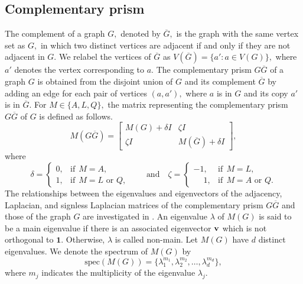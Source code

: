 \documentclass[12pt,a4paper]{article}
\def \v {{\bf v}}
\begin{document}
\subsection{Complementary prism}
The complement of a graph $G,$ denoted by $\overline{G},$ is the graph with the same vertex set as $G,$ in which two distinct vertices are adjacent if and only if they are not adjacent in $G.$ We relabel the vertices of $\overline{G}$ as $V(\overline{G})=\{a':a\in V(G)\},$ where $a'$ denotes the vertex corresponding to $a.$
The complementary prism $G\overline{G}$ of a graph $G$ is obtained from the disjoint union of $G$ and its complement $\overline{G}$ by adding an edge for each pair of vertices $(a,a'),$ where $a$ is in $G$ and its copy $a'$ is in $\overline{G}.$  
For $M\in\{A,L,Q\},$ the matrix representing the complementary prism $G\overline{G}$ of $G$ is defined as follows.
\begin{equation}\label{6eq3}
M(G\overline{G})=
\begin{bmatrix}
M(G)+\delta I & \zeta I\\
\zeta I & M(\overline{G})+\delta I
\end{bmatrix},
\end{equation}
where
\[
\delta=
\begin{cases}
0, & \text {if}~~M=A,\\
1, & \text {if}~~M=L\text{ or }Q,
\end{cases}
\qquad \text{and}\quad
\zeta=
\begin{cases}
-1, & \text{if}~~ M=L,\\
\phantom{-}1, & \text{if}~~ M=A\text{ or }Q.
\end{cases}
\] 
 The relationships between the eigenvalues and eigenvectors of the adjacency, Laplacian, and signless Laplacian matrices of the complementary prism $G\overline{G}$ and those of the graph $G$ are investigated in \cite{card1}. An eigenvalue $\lambda$ of $M(G)$ is said to be a main eigenvalue if there is an associated eigenvector $\v$ which is not orthogonal to $\mathbf{1}.$ Otherwise, $\lambda$ is called non-main. 
 Let $M(G)$ have $d$ distinct eigenvalues. We denote the spectrum of $M(G)$ by 
\[\text{spec}(M(G))=\{\lambda_1^{m_1},\lambda_2^{m_2},\ldots,\lambda_d^{m_d}\},\] 
where $m_j$ indicates the multiplicity of the eigenvalue $\lambda_j.$
\end{document}
